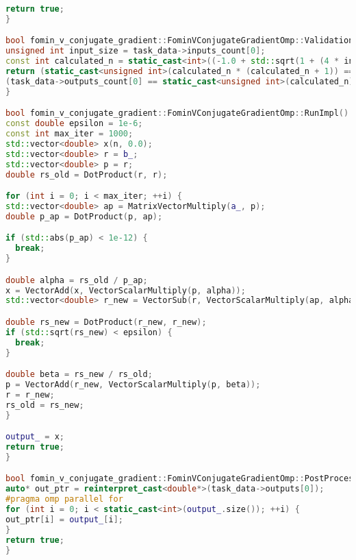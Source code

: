 \documentclass[12pt]{article}
\begin{document}
\begin{lstlisting}[language=C++]
return true;
}

bool fomin_v_conjugate_gradient::FominVConjugateGradientOmp::ValidationImpl() {
unsigned int input_size = task_data->inputs_count[0];
const int calculated_n = static_cast<int>((-1.0 + std::sqrt(1 + (4 * input_size))) / 2);
return (static_cast<unsigned int>(calculated_n * (calculated_n + 1)) == input_size) &&
(task_data->outputs_count[0] == static_cast<unsigned int>(calculated_n));
}

bool fomin_v_conjugate_gradient::FominVConjugateGradientOmp::RunImpl() {
const double epsilon = 1e-6;
const int max_iter = 1000;
std::vector<double> x(n, 0.0);
std::vector<double> r = b_;
std::vector<double> p = r;
double rs_old = DotProduct(r, r);

for (int i = 0; i < max_iter; ++i) {
std::vector<double> ap = MatrixVectorMultiply(a_, p);
double p_ap = DotProduct(p, ap);

if (std::abs(p_ap) < 1e-12) {
  break;
}

double alpha = rs_old / p_ap;
x = VectorAdd(x, VectorScalarMultiply(p, alpha));
std::vector<double> r_new = VectorSub(r, VectorScalarMultiply(ap, alpha));

double rs_new = DotProduct(r_new, r_new);
if (std::sqrt(rs_new) < epsilon) {
  break;
}

double beta = rs_new / rs_old;
p = VectorAdd(r_new, VectorScalarMultiply(p, beta));
r = r_new;
rs_old = rs_new;
}

output_ = x;
return true;
}

bool fomin_v_conjugate_gradient::FominVConjugateGradientOmp::PostProcessingImpl() {
auto* out_ptr = reinterpret_cast<double*>(task_data->outputs[0]);
#pragma omp parallel for
for (int i = 0; i < static_cast<int>(output_.size()); ++i) {
out_ptr[i] = output_[i];
}
return true;
}
\end{lstlisting}
\newpage
\begin{lstlisting}[language=C++]

\end{lstlisting}
\end{document}

